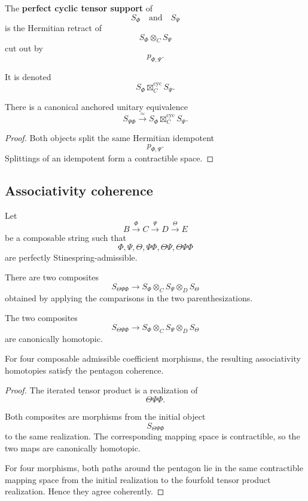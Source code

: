 \begin{definition}
\label{def:higher-perfect-cyclic-tensor-support}
The \textbf{perfect cyclic tensor support} of
\[
  S_\Phi
  \quad\text{and}\quad
  S_\Psi
\]
is the Hermitian retract of
\[
  S_\Phi\otimes_CS_\Psi
\]
cut out by
\[
  p_{\Phi,\Psi}.
\]

It is denoted
\[
  S_\Phi
  \boxtimes_C^{\mathrm{cyc}}
  S_\Psi.
\]
\end{definition}

\begin{corollary}
\label{cor:higher-minimal-composite-support}
There is a canonical anchored unitary equivalence
\[
  S_{\Psi\Phi}
  \xrightarrow{\simeq}
  S_\Phi
  \boxtimes_C^{\mathrm{cyc}}
  S_\Psi.
\]
\end{corollary}

\begin{proof}
Both objects split the same Hermitian idempotent
\[
  p_{\Phi,\Psi}.
\]
Splittings of an idempotent form a contractible space.
\end{proof}

\subsection{Associativity coherence}

Let
\[
  B\xrightarrow{\Phi}C
  \xrightarrow{\Psi}D
  \xrightarrow{\Theta}E
\]
be a composable string such that
\[
  \Phi,\Psi,\Theta,
  \Psi\Phi,
  \Theta\Psi,
  \Theta\Psi\Phi
\]
are perfectly Stinespring-admissible.

There are two composites
\[
  S_{\Theta\Psi\Phi}
  \longrightarrow
  S_\Phi\otimes_CS_\Psi\otimes_DS_\Theta
\]
obtained by applying the comparisons in the two parenthesizations.

\begin{proposition}
\label{prop:higher-stinespring-associativity-coherence}
The two composites
\[
  S_{\Theta\Psi\Phi}
  \longrightarrow
  S_\Phi\otimes_CS_\Psi\otimes_DS_\Theta
\]
are canonically homotopic.

For four composable admissible coefficient morphisms, the resulting
associativity homotopies satisfy the pentagon coherence.
\end{proposition}

\begin{proof}
The iterated tensor product is a realization of
\[
  \Theta\Psi\Phi.
\]

Both composites are morphisms from the initial object
\[
  S_{\Theta\Psi\Phi}
\]
to the same realization. The corresponding mapping space is contractible, so
the two maps are canonically homotopic.

For four morphisms, both paths around the pentagon lie in the same
contractible mapping space from the initial realization to the fourfold tensor
product realization. Hence they agree coherently.
\end{proof}


